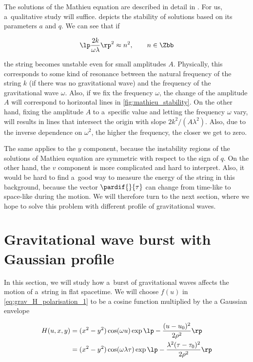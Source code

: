 \noindent
The solutions of the Mathieu equation are described in detail in \cite{lachlan}. For us, a~qualitative study will suffice.  depicts the stability of solutions based on its parameters $a$ and $q$. We can see that if 

\begin{equation}
\label{eq:resonance}
    \lp \frac{2 k}{\omega \lambda} \rp^2 \approx n^2, \qquad n \in \Zbb
\end{equation}

\noindent
the string becomes unstable even for small amplitudes $A$. Physically, this corresponds to some kind of resonance between the natural frequency of the string $k$ (if there was no gravitational wave) and the frequency of the gravitational wave $\omega$. Also, if we fix the frequency $\omega$, the change of the amplitude $A$ will correspond to horizontal lines in \cref{fig:mathieu_stability}. On the other hand, fixing the amplitude $A$ to a~specific value and letting the frequency $\omega$ vary, will results in lines that intersect the origin with slope $2k^2/(A \lambda^2)$. Also, due to the inverse dependence on $\omega^2$, the higher the frequency, the closer we get to zero.

The same applies to the $y$ component, because the instability regions of the solutions of Mathieu equation are symmetric with respect to the sign of $q$. On the other hand, the $v$ component is more complicated and hard to interpret. Also, it would be hard to find a~good way to measure the energy of the string in this background, because the vector $\pardif{ }{\tau}$ can change from time-like to space-like during the motion. We will therefore turn to the next section, where we hope to solve this problem with different profile of gravitational waves.




\section{Gravitational wave burst with Gaussian profile}

In this section, we will study how a~burst of gravitational waves affects the motion of a~string in flat spacetime. We will choose $f(u)$ in \cref{eq:grav_H_polarisation_1} 
to be a cosine function multiplied by the a Gaussian envelope

\begin{equation}
\begin{aligned}
    H(u, x, y) &= (x^2 - y^2) \cos(\omega u) \exp \lp -\frac{(u-u_0)^2}{2 \rho^2} \rp \\
    &= (x^2 - y^2) \cos(\omega \lambda \tau) \exp \lp -\frac{\lambda^2(\tau-\tau_0)^2}{2 \rho^2} \rp
\end{aligned}
\end{equation}

